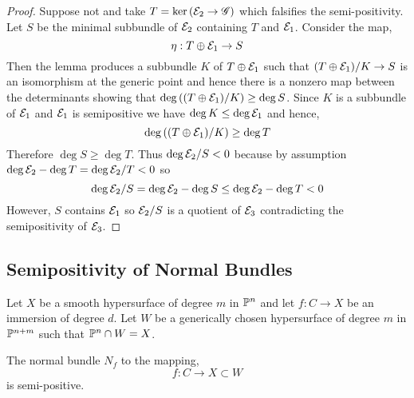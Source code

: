 \documentclass[12pt]{article}
\begin{document}
\begin{proof}
Suppose not and take $T = \ker{(\E_2 \to \G)}$ which falsifies the semi-positivity. Let $S$ be the minimal subbundle of $\E_2$ containing $T$ and $\E_1$. Consider the map,
\[ \eta : T \oplus \E_1 \to S \]
Then the lemma produces a subbundle $K$ of $T \oplus \E_1$ such that $(T \oplus \E_1)/K \to S$ is an isomorphism at the generic point and hence there is a nonzero map between the determinants showing that $\deg{((T \oplus \E_1)/K)} \ge \deg{S}$.
Since $K$ is a subbundle of $\E_1$ and $\E_1$ is semipositive we have $\deg{K} \le \deg{\E_1}$ and hence, 
\[ \deg{((T \oplus \E_1)/K)} \ge \deg{T} \]
Therefore $\deg{S} \ge \deg{T}$. Thus $\deg{\E_2/S} < 0$ because by assumption $\deg{\E_2} - \deg{T} = \deg{\E_2/T} < 0$ so 
\[ \deg{\E_2 / S} = \deg{\E_2} - \deg{S} \le \deg{\E_2} - \deg{T} < 0 \]
However, $S$ contains $\E_1$ so $\E_2 / S$ is a quotient of $\E_3$ contradicting the semipositivity of $\E_3$. 
\end{proof}

\subsection{Semipositivity of Normal Bundles}

Let $X$ be a smooth hypersurface of degree $m$ in $\P^n$ and let $f : C \to X$ be an immersion of degree $d$. Let $W$ be a generically chosen hypersurface of degree $m$ in $\P^{n+m}$ such that $\P^n \cap W = X$. 

\begin{lemma}
The normal bundle $N_{f}$ to the mapping,
\[ f : C \to X \subset W \]
is semi-positive.
\end{lemma}
\end{document}
